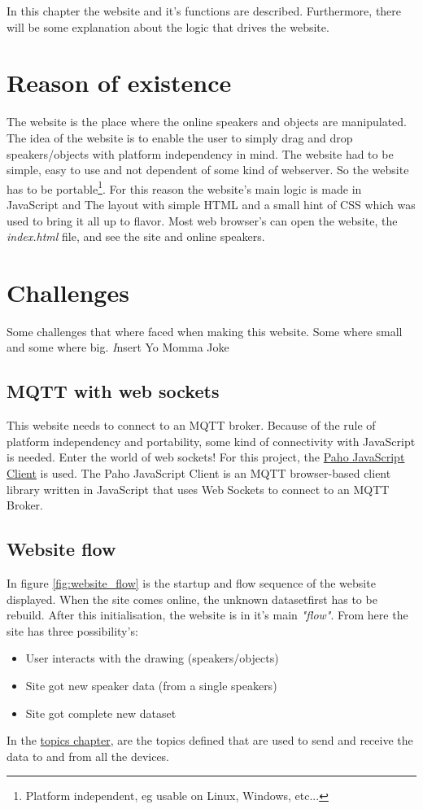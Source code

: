 In this chapter the website and it's functions are described. Furthermore, there will be some explanation about the logic that drives the website.

\section{Reason of existence}
The website is the place where the online speakers and objects are manipulated.
The idea of the website is to enable the user to simply drag and drop speakers/objects with platform independency in mind.
The website had to be simple, easy to use and not dependent of some kind of webserver.
So the website has to be portable\footnote{Platform independent, eg usable on Linux, Windows, etc...}.
For this reason the website's main logic is made in JavaScript and The layout with simple HTML and a small hint of CSS which was used to bring it all up to flavor.
Most web browser's can open the website, the \textit{index.html} file, and see the site and online speakers.

\section{Challenges}
Some challenges that where faced when making this website. Some where small and some where big. {\tiny\textit Insert Yo Momma Joke}

\subsection{MQTT with web sockets}
This website needs to connect to an MQTT broker. Because of the rule of platform independency and portability, some kind of connectivity with JavaScript is needed.
Enter the world of web sockets! For this project, the \href{https://github.com/eclipse/paho.mqtt.javascript}{Paho JavaScript Client} is used.
The Paho JavaScript Client is an MQTT browser-based client library written in JavaScript that uses Web Sockets to connect to an MQTT Broker.

\subsection{Website flow}
In figure \ref{fig:website_flow} is the startup and flow sequence of the website displayed.
When the site comes online, the unknown dataset\footnotemark first has to be rebuild.
After this initialisation, the website is in it's main \textit{"flow"}. From here the site has three possibility's:
\begin{itemize}
    \item User interacts with the drawing (speakers/objects)
    \item Site got new speaker data (from a single speakers)
    \item Site got complete new dataset
\end{itemize}
In the \hyperref[chap:Topics]{topics chapter}, are the topics defined that are used to send and receive the data to and from all the devices.

